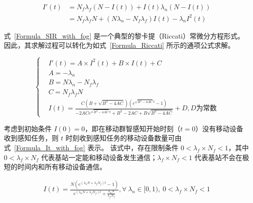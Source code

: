 
\begin{equation}
  \label{Formula_SIR_with_fog}
  \begin{aligned}
    I'(t) &= N_f \lambda_f (N-I(t)) + I(t) \lambda_n (N-I(t)) \\
    &= N_f \lambda_f N + ( N \lambda_n - N_f \lambda_f) I(t) - \lambda_n I^2(t) 
  \end{aligned}
\end{equation}

式~\eqref{Formula_SIR_with_fog} 是一个典型的黎卡提（Riccati）常微分方程形式。
因此，其求解过程可以转化为如式~\eqref{Formula_Riccati} 所示的通项公式求解。

\begin{equation}
  \label{Formula_Riccati}
  \left\{
    \begin{aligned}
      &I'(t) = A \times I^2(t) + B \times I(t) + C \\
      &A = -\lambda_n \\
      &B = N \lambda_n - N_f \lambda_f \\
      &C = N_f \lambda_f N \\
      &I(t) = \frac{C(B+\sqrt{B^2 - 4AC})(e^{\sqrt{B^2 - 4AC} t} - 1)}{-2ACe^{\sqrt{B^2 - 4AC} t} + B^2 -2AC + B \sqrt{B^2 - 4AC}} + D, D 为常数
    \end{aligned}
  \right.
\end{equation}

考虑到初始条件 $I(0)=0$，即在移动群智感知开始时刻（$t=0$）没有移动设备收到感知任务，则 $t$ 时刻收到感知任务的移动设备数量可由式~\eqref{Formula_It_with_fog} 表示。
该式中，存在限制条件 $0 < \lambda_f \times N_f < 1$，其中 $0 < \lambda_f \times N_f$ 代表基站一定能和移动设备发生通信；$\lambda_f \times N_f < 1$ 代表基站不会在极短的时间内和所有移动设备通信。

\begin{equation}
\label{Formula_It_with_fog}
\begin{aligned}
I(t) = \frac{N (e^{(\lambda_n N + \lambda_f N_f) t} - 1)}{e^{(\lambda_n N + \lambda_f N_f) t} + \frac{\lambda_n N}{\lambda_f N_f}}, \forall\ \lambda_n \in [0, 1),\ 0 < \lambda_f \times N_f < 1
\end{aligned}
\end{equation}

